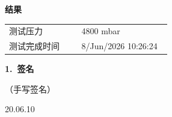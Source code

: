 \documentclass[UTF8,10pt,a4paper,fontset=fandol]{ctexart}
\newcommand{\fieldvalue}[1]{#1}
\newcommand{\handwritten}[1]{#1}
\begin{document}
\begin{minipage}[t]{0.47\linewidth}
\textbf{结果}

\begin{tabular}{@{}p{0.42\linewidth}p{0.52\linewidth}@{}}
测试压力 &
\fieldvalue{4800 mbar}
\\
测试完成时间 &
\fieldvalue{8/Jun/2026 10:26:24}
\\
\end{tabular}

\vspace{1em}

\textbf{1.\ 签名}

\fieldvalue{\handwritten{（手写签名）}}

\fieldvalue{\handwritten{20.06.10}}
\end{minipage}
\hfill
\end{document}
